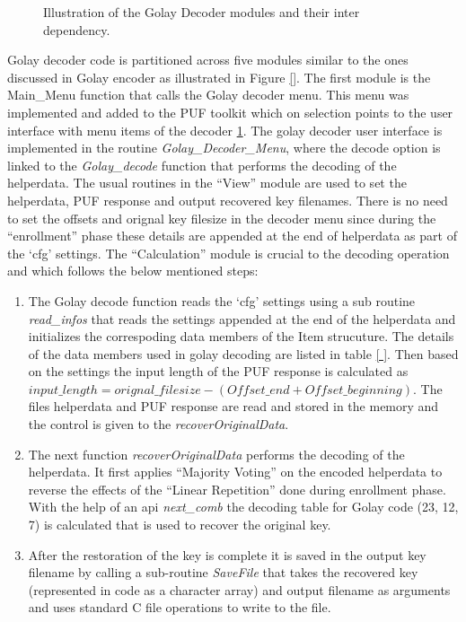 \begin{figure}
\centering
{}
\caption{Illustration of the Golay Decoder modules and their inter dependency.}
\label{img:golay_decoder_ui}
\end{figure}

Golay decoder code is partitioned across five modules similar to the ones discussed in Golay encoder as illustrated in Figure \ref{}. The first module is the Main\_Menu function that calls the Golay decoder menu. This menu was implemented and added to the PUF toolkit which on selection points to the user interface with menu items of the decoder \ref{img:golay_decoder_ui}. The golay decoder user interface is implemented in the routine \emph{Golay\_Decoder\_Menu}, where the decode option is linked to the \emph{Golay\_decode}
function that performs the decoding of the helperdata. The usual routines in the ``View'' module are used to set the helperdata, PUF response and output recovered key filenames. There is no need to set the offsets and orignal key filesize in the decoder menu since during the ``enrollment'' phase these details are appended at the end of helperdata as part of the `cfg' settings. The ``Calculation'' module is crucial to the decoding operation and which follows the below mentioned
steps:
\begin{enumerate}
	\item The Golay decode function reads the `cfg' settings using a sub routine \emph{read\_infos} that reads the settings appended at the end of the helperdata and initializes the correspoding data members of the Item strucuture. The details of the data members used in golay decoding are listed in table \ref{ }. Then based on the settings the input length of the PUF response is calculated as $input\_length = orignal\_filesize - (Offset\_end + Offset\_beginning)$. The files
		helperdata and PUF response are read and stored in the memory and the control is given to the \emph{recoverOriginalData}.
	\item The next function \emph{recoverOriginalData} performs the decoding of the helperdata. It first applies ``Majority Voting'' on the encoded helperdata to reverse the effects of the ``Linear Repetition'' done during enrollment phase. With the help of an api \emph{next\_comb} the decoding table for Golay code (23, 12, 7) is calculated that is used to recover the original key. 
	\item After the restoration of the key is complete it is saved in the output key filename by calling a
		sub-routine \emph{SaveFile} that takes the recovered key (represented in code as a character array) and output filename as arguments and uses standard C file operations to write to the file.
\end{enumerate}


